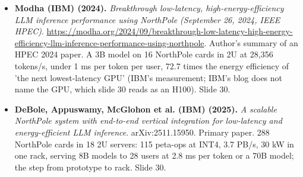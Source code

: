 \begin{itemize}[leftmargin=1.2em,itemsep=3pt]
\item \textbf{Modha (IBM) (2024).} \textit{Breakthrough low-latency, high-energy-efficiency LLM inference performance using NorthPole (September 26, 2024, IEEE HPEC)}. \url{https://modha.org/2024/09/breakthrough-low-latency-high-energy-efficiency-llm-inference-performance-using-northpole}. Author's summary of an HPEC 2024 paper. A 3B model on 16 NorthPole cards in 2U at 28,356 tokens/s, under 1 ms per token per user, 72.7 times the energy efficiency of 'the next lowest-latency GPU' (IBM's measurement; IBM's blog does not name the GPU, which slide 30 reads as an H100). Slide 30.
\item \textbf{DeBole, Appuswamy, McGlohon et al. (IBM) (2025).} \textit{A scalable NorthPole system with end-to-end vertical integration for low-latency and energy-efficient LLM inference}. arXiv:2511.15950. Primary paper. 288 NorthPole cards in 18 2U servers: 115 peta-ops at INT4, 3.7 PB/s, 30 kW in one rack, serving 8B models to 28 users at 2.8 ms per token or a 70B model; the step from prototype to rack. Slide 30.
\end{itemize}
